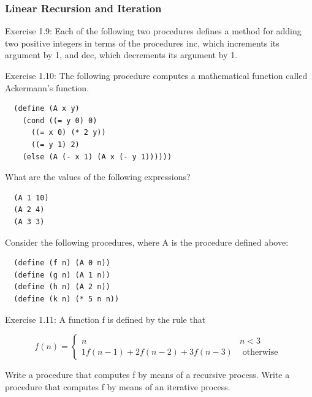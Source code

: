             \subsubsection{Linear Recursion and Iteration}
Exercise 1.9: Each of the following two procedures defines a method for adding two positive integers in terms of the procedures inc, which increments its argument by 1, and dec, which decrements its argument by 1.
\newline

Exercise 1.10: The following procedure computes a mathematical function called Ackermann's function.
\begin{verbatim}
  (define (A x y)
    (cond ((= y 0) 0)
      ((= x 0) (* 2 y))
      ((= y 1) 2)
    (else (A (- x 1) (A x (- y 1))))))
\end{verbatim}
\newline
What are the values of the following expressions?

\newline
\begin{verbatim}
  (A 1 10)
  (A 2 4)
  (A 3 3)
\end{verbatim}

Consider the following procedures, where A is the procedure defined above:
\newline
\begin{verbatim}
  (define (f n) (A 0 n))
  (define (g n) (A 1 n))
  (define (h n) (A 2 n))
  (define (k n) (* 5 n n))
\end{verbatim}
\newline


Exercise 1.11: A function f is defined by the rule that 

\begin{equation}
f\left(n\right) = 
\begin{cases}
n & n < 3 \\
1 f\left(n-1\right) + 2 f\left(n-2\right) + 3 f\left(n-3\right) & \mbox{ otherwise }
\end{cases}
\label{eq:ss_recursive}
\end{equation}

Write a procedure that computes f by means of a recursive process. Write a procedure that computes f by means of an iterative process.
\newline

